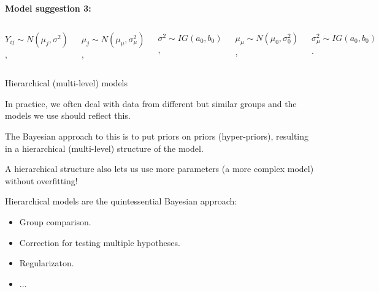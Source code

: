 \begin{frame}
\begin{analysis}

\bigskip

\textbf{Model suggestion 3:}

\bigskip

\begin{columns}[c]
\centering
{}
$ Y_{ij} \sim N(\mu_j, \sigma^2)$, 

$ \mu_j \sim N(\mu_{\mu}, \sigma_{\mu}^2)$, 

$ \sigma^2 \sim IG(a_0, b_0)$,

$ \mu_{\mu} \sim N(\mu_0, \sigma^2_0)$, 

$ \sigma_{\mu}^2 \sim IG(a_0,b_0)$.


\begin{center}
\end{center}
\end{columns}

\smallskip

\end{analysis}
\end{frame}


\begin{frame}{Hierarchical (multi-level) models}

In practice, we often deal with data from different but similar groups and the models we use should reflect this.

\bigskip

The Bayesian approach to this is to put priors on priors (hyper-priors), resulting in a hierarchical (multi-level) structure of the model.

\bigskip

A hierarchical structure also lets us use more parameters (a more complex model) without overfitting!

\bigskip

Hierarchical models are the quintessential Bayesian approach:
\begin{itemize}
\item Group comparison.
\item Correction for testing multiple hypotheses.
\item Regularizaton.
\item ...
\end{itemize}

\end{frame}


